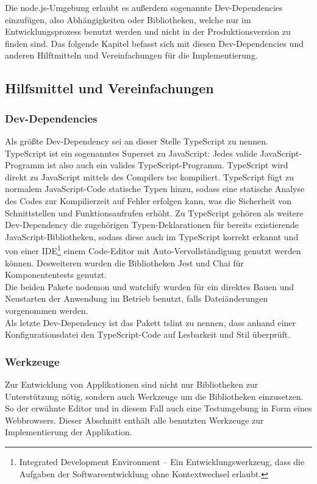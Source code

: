 Die node.js-Umgebung erlaubt es außerdem sogenannte Dev-Dependencies einzufügen, also Abhängigkeiten oder Bibliotheken, welche nur im Entwicklungsprozess benutzt werden und nicht in der Produktionsversion zu finden sind. Das folgende Kapitel befasst sich mit diesen Dev-Dependencies und anderen Hilftmitteln und Vereinfachungen für die Implementierung.
\subsection{Hilfsmittel und Vereinfachungen}
\label{subsec:Hilfsmittel}

\subsubsection{Dev-Dependencies}

Als größte Dev-Dependency sei an dieser Stelle TypeScript zu nennen. TypeScript ist ein sogenanntes Superset zu JavaScript: Jedes valide JavaScript-Programm ist also auch ein valides TypeScript-Programm. TypeScript wird direkt zu JavaScript mittels des Compilers tsc kompiliert. TypeScript fügt zu normalem JavaScript-Code statische Typen hinzu, sodass eine statische Analyse des Codes zur Kompilierzeit auf Fehler erfolgen kann, was die Sicherheit von Schnittstellen und Funktionsaufrufen erhöht. Zu TypeScript gehören als weitere Dev-Dependency die zugehörigen Typen-Deklarationen für bereits existierende JavaScript-Bibliotheken, sodass diese auch im TypeScript korrekt erkannt und von einer IDE\footnote{Integrated Development Environment -- Ein Entwicklungswerkzeug, dass die Aufgaben der Softwareentwicklung ohne Kontextwechsel erlaubt.} \bzw einem Code-Editor mit Auto-Vervollständigung genutzt werden können.
\clearpage
Desweiteren wurden die Bibliotheken Jest und Chai für Komponententests genutzt.\\
Die beiden Pakete nodemon und watchify wurden für ein direktes Bauen und Neustarten der Anwendung im Betrieb benutzt, falls Dateiänderungen vorgenommen werden.\\
Als letzte Dev-Dependency ist das Pakett tslint zu nennen, dass anhand einer Konfigurationsdatei den TypeScript-Code auf Lesbarkeit und Stil überprüft.

\subsubsection{Werkzeuge}

Zur Entwicklung von Applikationen sind nicht nur Bibliotheken zur Unterstützung nötig, sondern auch Werkzeuge um die Bibliotheken einzusetzen. So \zB der erwähnte Editor und in diesem Fall auch eine Testumgebung in Form eines Webbrowsers. Dieser Abschnitt enthält alle benutzten Werkzeuge zur Implementierung der Applikation.

